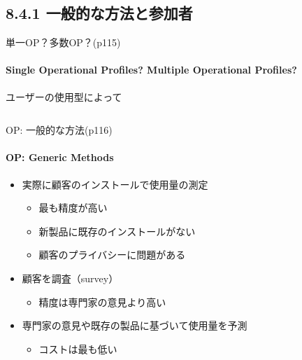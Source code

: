 \subsection{8.4.1 一般的な方法と参加者}
\begin{frame}{単一OP？多数OP？(p115)}
\framesubtitle{Single Operational Profiles? Multiple Operational Profiles?}
ユーザーの使用型によって
\begin{columns}
\begin{column}{0.5\textwidth}
\begin{center}
\end{center}
\end{column}
\begin{column}{0.5\textwidth}
\begin{center}
\end{center}
\end{column}
\end{columns}
\end{frame}
\begin{frame}{OP: 一般的な方法(p116)}
\framesubtitle{OP: Generic Methods}
\begin{itemize}
\item 実際に顧客のインストールで使用量の測定
    \begin{itemize}
    \item 最も精度が高い
    \item 新製品に既存のインストールがない
    \item 顧客のプライバシーに問題がある
    \end{itemize}
\item 顧客を調査（survey）
    \begin{itemize}
    \item 精度は専門家の意見より高い
    \end{itemize}
\item 専門家の意見や既存の製品に基づいて使用量を予測
    \begin{itemize}
    \item コストは最も低い
    \end{itemize}
\end{itemize}
\end{frame}
